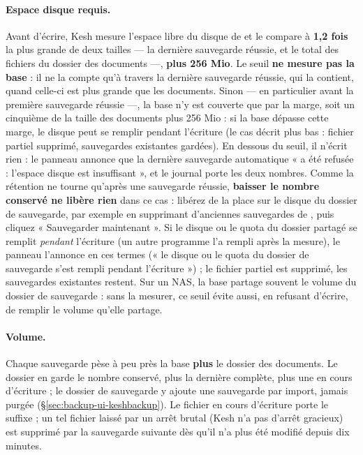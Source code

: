 \documentclass[a4paper,11pt,oneside]{article}
\begin{document}
\paragraph{Espace disque requis.} Avant d'écrire, Kesh mesure l'espace libre du disque de  et le compare à \textbf{1,2 fois} la plus grande de deux tailles --- la dernière sauvegarde réussie, et le total des fichiers du dossier des documents ---, \textbf{plus 256 Mio}. Le seuil \textbf{ne mesure pas la base} : il ne la compte qu'à travers la dernière sauvegarde réussie, qui la contient, quand celle-ci est plus grande que les documents. Sinon --- en particulier avant la première sauvegarde réussie ---, la base n'y est couverte que par la marge, soit un cinquième de la taille des documents plus 256 Mio : si la base dépasse cette marge, le disque peut se remplir pendant l'écriture (le cas décrit plus bas : fichier partiel supprimé, sauvegardes existantes gardées). En dessous du seuil, il n'écrit rien : le panneau annonce que la dernière sauvegarde automatique « a été refusée : l'espace disque est insuffisant », et le journal porte les deux nombres. Comme la rétention ne tourne qu'après une sauvegarde réussie, \textbf{baisser le nombre conservé ne libère rien} dans ce cas : libérez de la place sur le disque du dossier de sauvegarde, par exemple en supprimant d'anciennes sauvegardes de , puis cliquez « Sauvegarder maintenant ». Si le disque ou le quota du dossier partagé se remplit \emph{pendant} l'écriture (un autre programme l'a rempli après la mesure), le panneau l'annonce en ces termes (« le disque ou le quota du dossier de sauvegarde s'est rempli pendant l'écriture ») ; le fichier partiel est supprimé, les sauvegardes existantes restent. Sur un NAS, la base partage souvent le volume du dossier de sauvegarde : sans la mesurer, ce seuil évite aussi, en refusant d'écrire, de remplir le volume qu'elle partage.

\paragraph{Volume.} Chaque sauvegarde pèse à peu près la base \textbf{plus} le dossier des documents. Le dossier  en garde le nombre conservé, plus la dernière complète, plus une en cours d'écriture ; le dossier de sauvegarde y ajoute une sauvegarde par import, jamais purgée (\S\ref{sec:backup-ui-keshbackup}). Le fichier en cours d'écriture porte le suffixe  ; un tel fichier laissé par un arrêt brutal (Kesh n'a pas d'arrêt gracieux) est supprimé par la sauvegarde suivante dès qu'il n'a plus été modifié depuis dix minutes.
\end{document}
